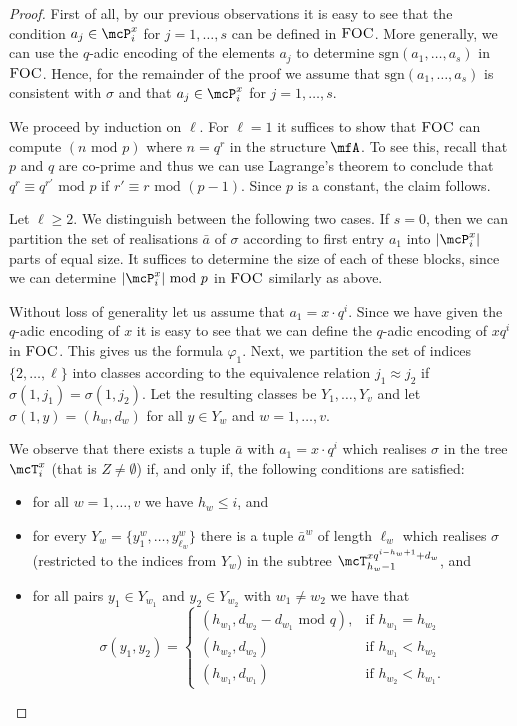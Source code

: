 \documentclass[a4paper,UKenglish]{lipics}
\newcommand{\card}[1]{\ensuremath{|#1|}}
\newcommand{\sgn}{\ensuremath{\textrm{sgn}}}
\newcommand{\modulo}{\ensuremath{\text{mod }}}
\newcommand{\logic}[1]{\ensuremath{\textsc{#1}}\xspace}
\newcommand{\FOC}{\logic{FOC}}
\renewcommand{\phi}{\varphi}
\newcommand{\ba}{{\bar a}}
\theoremstyle{plain}
\begin{document}
\begin{proof}
 First of all, by our previous observations it is easy to see that the 
condition $a_j \in \mcP_i^x$ for $j = 1, \dots, s$ can be defined in 
$\FOC$. More generally, we can use the $q$-adic encoding of the elements 
$a_j$ to determine $\sgn(a_1, \dots, a_s)$ in $\FOC$. Hence, for the 
remainder of the proof we assume that $\sgn(a_1, \dots, a_s)$ is consistent 
with $\sigma$ and that $a_j \in \mcP_i^x$ for $j = 1, \dots, s$.

We proceed by induction on $\ell$. For $\ell = 1$ it suffices to 
show that $\FOC$ can compute $(n \,\,\modulo p)$ where $n =q^r$ in the 
structure $\mfA$. To see this, recall that $p$ and $q$ are co-prime and 
thus we can use Lagrange's theorem to conclude that $q^r \equiv q^{r'} 
\,\,\modulo p$ if $r' \equiv r \,\,\modulo (p-1)$. 
Since $p$ is a constant, the claim follows.

Let $\ell \geq 2$. We distinguish between the following two cases. If $s = 0$, 
then we can partition the set of realisations $\ba$ of $\sigma$ according 
to first entry $a_1$ into $\card{\mcP_i^x}$ parts of 
equal size.
It suffices to determine the size of each of these blocks, since we can
determine $\card{\mcP_i^x} \,\,\modulo p$
in $\FOC$ similarly as above.

Without loss of generality let us assume that $a_1 = x \cdot q^i$. Since 
we 
have given the $q$-adic encoding of $x$ it is easy to see that we can 
define the $q$-adic encoding of $xq^i$ in \FOC. This gives us the formula 
$\phi_1$.
Next, we partition the set of indices $\{ 2, \dots, \ell \}$ into classes 
according to the
equivalence relation
$j_1 \approx j_2$ if $\sigma(1,{j_1}) = \sigma(1,{j_2})$. Let the
resulting
classes be $Y_1, \dots, Y_v$ and let $\sigma(1,y) = (h_w, d_w)$ for all
$y \in Y_w$ and $w = 1, \dots, v$. 

We observe that there exists a tuple $\ba$ with $a_1 = x \cdot q^i$ which
realises $\sigma$ in the tree $\mcT_i^x$ (that is $Z \neq \emptyset$)
if, and only if, the following conditions are satisfied:

\begin{itemize}
 \item for all $w = 1, \dots, v$ we have $h_w \leq i$, and
 \item for every $Y_w = \{ y^w_1, \dots, y^w_{\ell_w} \}$ there is a 
tuple $\ba^w$ of length $\ell_w$ which realises $\sigma$ (restricted to the
indices from $Y_w$) in the subtree $\mcT_{h_w-1}^{xq^{i-h_w+1}+d_w}$, and
 \item for all pairs $y_1 \in Y_{w_1}$ and $y_2 \in Y_{w_2}$ with $w_1 
\neq w_2$ we
have that 
  \[\sigma({y_1},{y_2}) = \begin{cases}
        (h_{w_1},d_{w_2} - d_{w_1} \,\,\modulo q), & \text{if } h_{w_1} = 
h_{w_2} 
\\
        (h_{w_2},d_{w_2}) & \text{if } h_{w_1} < h_{w_2} \\
        (h_{w_1},d_{w_1}) & \text{if } h_{w_2} < h_{w_1}.
                  \end{cases} \]
\end{itemize}


\end{proof}
\end{document}
